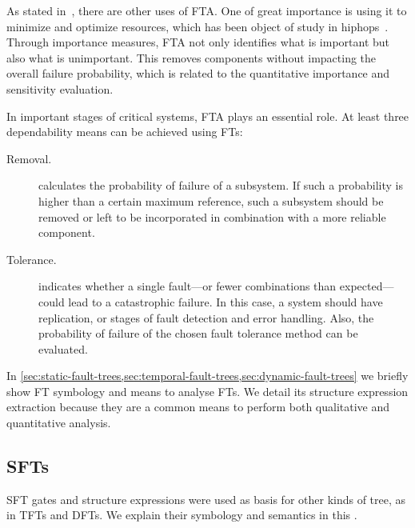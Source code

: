 \documentclass[12pt,openright,twoside,a4paper,oldfontcommands,english,brazil,final]{abntex2}
\theoremstyle{theo}
\begin{document}
As stated in~\cite{SVD+2002}, there are other uses of \ac{FTA}.
One of great importance is using it to minimize and optimize resources, which has been object of study in \ac{hiphops}~\cite{APS+2011}.
Through importance measures, \ac{FTA} not only identifies what is important but also what is unimportant.
This removes components without impacting the overall failure probability, which is related to the quantitative importance and sensitivity evaluation.

\begin{sloppypar}
In important stages of critical systems, \ac{FTA} plays an essential role.
At least three dependability means can be achieved using \acp{FT}:
%
\begin{description}
  \item[Removal.]
   calculates the probability of failure of a subsystem.
   If such a probability is higher than a certain maximum reference, such a subsystem should be removed or left to be incorporated in combination with a more reliable component.
  \item[Tolerance.]
   indicates whether a single fault---or fewer combinations than expected---could lead to a catastrophic failure.
  In this case, a system should have replication, or stages of fault detection and error handling.
  Also, the probability of failure of the chosen fault tolerance method can be evaluated.
\end{description}
\end{sloppypar}

In \cref{sec:static-fault-trees,sec:temporal-fault-trees,sec:dynamic-fault-trees} we briefly show \ac{FT} symbology and means to analyse \acp{FT}.
We detail its structure expression extraction because they are a common means to perform both qualitative and quantitative analysis.

\subsection{\Aclp*{SFT}}
\label{sec:static-fault-trees}

\Ac{SFT} gates and structure expressions were used as basis for other kinds of tree, as in \acp{TFT} and \acp{DFT}.
We explain their symbology and semantics in this .
\end{document}
